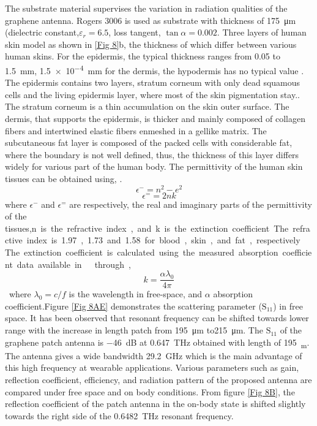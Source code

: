 \documentclass[12pt]{suhbook}
\begin{document}
The substrate material supervises the variation in radiation qualities of the graphene antenna. Rogers \num{3006} is used as substrate with thickness of \SI{175}{\um} (dielectric constant,$\varepsilon_r = 6.5$, loss tangent, $\tan {\alpha} = 0.002$. Three layers of human skin model as shown in \ref{Fig 8}b, the thickness of which differ between various human skins. For the epidermis, the typical thickness ranges from \num{0.05} to \SI{1.5}{\mm}, \SI{1.5e-4}{\mm} for the dermis, the hypodermis has no typical value \cite{dashti2018graphene}. The epidermis contains two layers, stratum corneum with only dead squamous cells and the living epidermis layer, where most of the skin pigmentation stay.\cite{abadal2015time}. The stratum corneum is a thin accumulation on the skin outer surface. The dermis, that supports the epidermis, is thicker and mainly composed of collagen fibers and intertwined elastic fibers enmeshed in a gellike matrix. The subcutaneous fat layer is composed of the packed cells with considerable fat, where the boundary is not well defined, thus, the thickness of this layer differs widely for various part of the human body. The permittivity of the human skin tissues can be obtained using,\cite{berry2003optical} \cite{yang2015numerical}.
% 
\begin{equation}
   \epsilon^- =n^2-e^2
   \label{eq:real perimttivity}
\end{equation}
% 
\begin{equation}
\epsilon^= =2nk
\label{eq:imag perimttivity}
\end{equation}
% 
where $\epsilon^-$ and $\epsilon^=$ are respectively, the real and imaginary parts of the permittivity of the tissues,\SI{n} is the refractive index, and \SI{k} is the extinction coefficient. The refractive index is \SI{1.97}, \SI{1.73} and \SI{1.58} for blood, skin, and fat, respectively \cite{yang2015numerical}. The extinction coefficient is calculated using the measured absorption coefficient data available in \cite{fitzgerald2003catalogue} \cite{berry2003optical} through,
\begin{equation}
k=\frac{\alpha\lambda_0}{4\pi}
\label{eq:abdorption}
\end{equation}
% 
where $\lambda_0 = c/f$ is the wavelength in free-space, and $\alpha$  absorption coefficient.Figure \ref{Fig 8AE} demonstrates the scattering parameter ($\mathrm{S_{11}}$) in free space. It has been observed that resonant frequency can be shifted towards lower range with the increase in length patch from \SI{195}{\um} to\SI{215}{\um}. The $\mathrm{S_{11}}$ of the graphene patch antenna is \SI{-46}{\dB} at \SI{0.647}{\THz} obtained with length of \SI{195}{\nu_m}. The antenna gives a wide bandwidth \SI{29.2}{\GHz} which is the main advantage of this high frequency at wearable applications. Various parameters such as gain, reflection coefficient, efficiency, and radiation pattern of the proposed antenna are compared under free space and on body conditions. From figure \ref{Fig 8B}, the reflection coefficient of the patch antenna in the on-body state is shifted slightly towards the right side of the \SI{0.6482}{\THz} resonant frequency.
\end{document}
